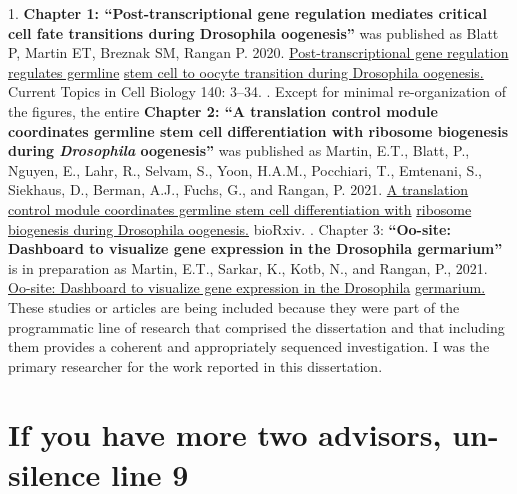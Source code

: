 \documentclass[12pt,oneside]{reedthesis}
\begin{document}
  \begin{attribution}
  \pagestyle{plain}
    1. \textbf{Chapter 1: ``Post-transcriptional gene regulation mediates critical cell fate transitions during Drosophila oogenesis''} was published as Blatt P, Martin ET, Breznak SM, Rangan P. 2020. \underline{Post-transcriptional gene regulation regulates germline} \underline{stem cell to oocyte transition during Drosophila oogenesis.} Current Topics in Cell Biology 140: 3--34.
    \newline {}. Except for minimal re-organization of the figures, the entire \textbf{Chapter 2: ``A translation control module coordinates germline stem cell differentiation with ribosome biogenesis during \emph{Drosophila} oogenesis''} was published as Martin, E.T., Blatt, P., Nguyen, E., Lahr, R., Selvam, S., Yoon, H.A.M., Pocchiari, T., Emtenani, S., Siekhaus, D., Berman, A.J., Fuchs, G., and Rangan, P. 2021. \underline{A translation control module coordinates germline stem cell differentiation with} \underline{ribosome biogenesis during Drosophila oogenesis.} bioRxiv.
    \newline {}. Chapter 3: \textbf{``Oo-site: Dashboard to visualize gene expression in the Drosophila germarium''} is in preparation as Martin, E.T., Sarkar, K., Kotb, N., and Rangan, P., 2021. \underline{Oo-site: Dashboard to visualize gene expression in the Drosophila} \underline{germarium.}
    \newline \newline
    These studies or articles are being included because they were part of the programmatic line of research that comprised the dissertation and that including them provides a coherent and appropriately sequenced investigation.
    \newline \newline
    I was the primary researcher for the work reported in this dissertation.
  \end{attribution}
  \hypersetup{linkcolor=black}
  \setcounter{secnumdepth}{2}
  \setcounter{tocdepth}{2}
  \pagestyle{plain}
  \tableofcontents

  \listoftables
  \pagestyle{plain}

  \listoffigures
  \pagestyle{plain}

\mainmatter %
\pagestyle{plain} %

\hypertarget{if-you-have-more-two-advisors-un-silence-line-9}{%
\chapter{If you have more two advisors, un-silence line 9}\label{if-you-have-more-two-advisors-un-silence-line-9}}
\end{document}
